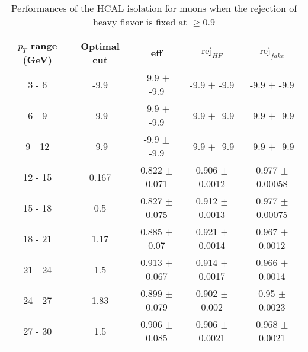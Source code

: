 \begin{table}[htbp]
   \centering
   \begin{tabular}{|c|c|c|c|c|}
      \hline
      $p_T$ range (GeV) & Optimal cut & eff & $\textrm{rej}_{HF}$ & $\textrm{rej}_{fake}$ \\
      \hline
      3 - 6 & -9.9 & -9.9 $\pm$ -9.9 & -9.9 $\pm$ -9.9 & -9.9 $\pm$ -9.9 \\
      \hline
      6 - 9 & -9.9 & -9.9 $\pm$ -9.9 & -9.9 $\pm$ -9.9 & -9.9 $\pm$ -9.9 \\
      \hline
      9 - 12 & -9.9 & -9.9 $\pm$ -9.9 & -9.9 $\pm$ -9.9 & -9.9 $\pm$ -9.9 \\
      \hline
      12 - 15 & 0.167 & 0.822 $\pm$ 0.071 & 0.906 $\pm$ 0.0012 & 0.977 $\pm$ 0.00058 \\
      \hline
      15 - 18 & 0.5 & 0.827 $\pm$ 0.075 & 0.912 $\pm$ 0.0013 & 0.977 $\pm$ 0.00075 \\
      \hline
      18 - 21 & 1.17 & 0.885 $\pm$ 0.07 & 0.921 $\pm$ 0.0014 & 0.967 $\pm$ 0.0012 \\
      \hline
      21 - 24 & 1.5 & 0.913 $\pm$ 0.067 & 0.914 $\pm$ 0.0017 & 0.966 $\pm$ 0.0014 \\
      \hline
      24 - 27 & 1.83 & 0.899 $\pm$ 0.079 & 0.902 $\pm$ 0.002 & 0.95 $\pm$ 0.0023 \\
      \hline
      27 - 30 & 1.5 & 0.906 $\pm$ 0.085 & 0.906 $\pm$ 0.0021 & 0.968 $\pm$ 0.0021 \\
      \hline
   \end{tabular}
   \caption{\small{Performances of the HCAL isolation for muons when the rejection of heavy flavor is fixed at $\geq 0.9$}\label{tab:hcal_muon_pureHf}}
\end{table}






